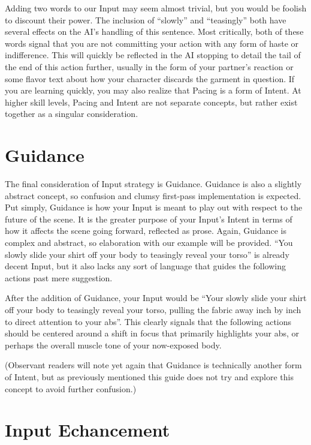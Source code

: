 \documentclass[Source-main.tex]{subfiles}
\begin{document}
Adding two words to our Input may seem almost trivial, but you would be foolish to discount their power.
The inclusion of “slowly” and “teasingly” both have several effects on the AI’s handling of this sentence.
Most critically, both of these words signal that you are not committing your action with any form of haste or indifference.
This will quickly be reflected in the AI stopping to detail the tail of the end of this action further, usually in the form of your partner’s reaction or some flavor text about how your character discards the garment in question.
If you are learning quickly, you may also realize that Pacing is a form of Intent.
At higher skill levels, Pacing and Intent are not separate concepts, but rather exist together as a singular consideration.

\section{Guidance}

The final consideration of Input strategy is Guidance.
Guidance is also a slightly abstract concept, so confusion and clumsy first-pass implementation is expected.
Put simply, Guidance is how your Input is meant to play out with respect to the future of the scene.
It is the greater purpose of your Input’s Intent in terms of how it affects the scene going forward, reflected as prose.
Again, Guidance is complex and abstract, so elaboration with our example will be provided.
“You slowly slide your shirt off your body to teasingly reveal your torso” is already decent Input, but it also lacks any sort of language that guides the following actions past mere suggestion.

After the addition of Guidance, your Input would be “Your slowly slide your shirt off your body to teasingly reveal your torso, pulling the fabric away inch by inch to direct attention to your abs”.
This clearly signals that the following actions should be centered around a shift in focus that primarily highlights your abs, or perhaps the overall muscle tone of your now-exposed body.

(Observant readers will note yet again that Guidance is technically another form of Intent, but as previously mentioned this guide does not try and explore this concept to avoid further confusion.)

\section{Input Echancement}
\end{document}
